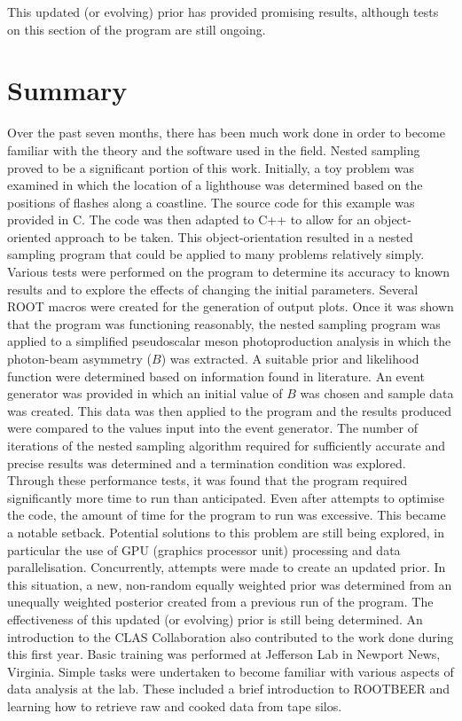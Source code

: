 \documentclass[a4paper,12pt]{article}
\begin{document}
This updated (or evolving) prior has provided promising results, although tests on this section of the program are still ongoing.

\newpage

\section{Summary}
Over the past seven months, there has been much work done in order to become familiar with the theory and the software used in the field. Nested sampling proved to be a significant portion of this work.  Initially, a toy problem was examined in which the location of a lighthouse was determined based on the positions of flashes along a coastline.  The source code for this example was provided in C.  The code was then adapted to C++ to allow for an object-oriented approach to be taken.  This object-orientation resulted in a nested sampling program that could be applied to many problems relatively simply.  Various tests were performed on the program to determine its accuracy to known results and to explore the effects of changing the initial parameters. Several ROOT macros were created for the generation of output plots.  Once it was shown that the program was functioning reasonably, the nested sampling program was applied to a simplified pseudoscalar meson photoproduction analysis in which the photon-beam asymmetry ($B$) was extracted.  A suitable prior and likelihood function were determined based on information found in literature.  An event generator was provided in which an initial value of $B$ was chosen and sample data was created.  This data was then applied to the program and the results produced were compared to the values input into the event generator.  The number of iterations of the nested sampling algorithm required for sufficiently accurate and precise results was determined and a termination condition was explored.  Through these performance tests, it was found that the program required significantly more time to run than anticipated.  Even after attempts to optimise the code, the amount of time for the program to run was excessive.  This became a notable setback.  Potential solutions to this problem are still being explored, in particular the use of GPU (graphics processor unit) processing and data parallelisation.  Concurrently, attempts were made to create an updated prior.  In this situation, a new, non-random equally weighted prior was determined from an unequally weighted posterior created from a previous run of the program.  The effectiveness of this updated (or evolving) prior is still being determined.
\newline
An introduction to the CLAS Collaboration also contributed to the work done during this first year.  Basic training was performed at Jefferson Lab in Newport News, Virginia.  Simple tasks were undertaken to become familiar with various aspects of data analysis at the lab.  These included a brief introduction to ROOTBEER and learning how to retrieve raw and cooked data from tape silos.  
\end{document}
